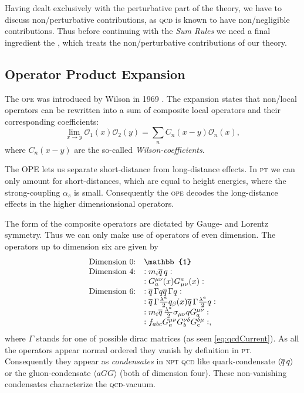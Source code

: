 \documentclass[../../index.tex]{subfiles}
\begin{document}
Having dealt exclusively with the perturbative part of the theory, we have to
discuss non\-/perturbative contributions, as \textsc{qcd} is known to have
non\-/negligible contributions. Thus before continuing with the \textit{Sum
  Rules} we need a final ingredient the , which treats the non\-/perturbative contributions of our theory.


\subsection{Operator Product Expansion}
The \textsc{ope} was introduced by Wilson in 1969 \cite{Wilson1969}. The
expansion states that non\-/local operators can be rewritten into a sum of
composite local operators and their corresponding coefficients:
\begin{equation}
  \label{eq:ope}
  \lim_{x\to y} \mathcal{O}_1(x) \mathcal{O}_2(y) = \sum_n C_n(x-y)\mathcal{O}_n(x),
\end{equation}
where $C_n(x-y)$ are the so-called \textit{Wilson-coefficients}.

The OPE lets us separate short-distance from long-distance effects. In
\textsc{pt} we can only amount for short-distances, which are equal to height
energies, where the strong-coupling $\alpha_s$ is small. Consequently the \textsc{ope}
decodes the long-distance effects in the higher dimensionsional operators.

The form of the composite operators are dictated by Gauge- and Lorentz symmetry.
Thus we can only make use of operators of even dimension. The operators up to
dimension six are given by \cite{Pascual1984}
\begin{equation}
  \begin{array}{ll}
    \text{Dimension 0:} & \mathbb{1} \\
    \text{Dimension 4:} & :m_i \anti{q} q: \\
                        & :G_a^{\mu\nu}(x) G_{\mu\nu}^a(x): \\
    \text{Dimension 6:} & :\anti{q} \Gamma q \anti{q} \Gamma q: \\
                        & :\anti{q} \Gamma \frac{\lambda^a}{2} q_\beta(x) \anti{q} \Gamma \frac{\lambda^a}{2} q: \\
                        & :m_i \anti{q} \frac{\lambda^a}{2} \sigma_{\mu\nu} q G^{\mu\nu}_a: \\
                        & :f_{abc} G_a^{\mu\nu} G_b^{\nu\delta} G_c^{\delta\mu}:,
  \end{array}
\end{equation}
where $\Gamma$ stands for one of possible dirac matrices (as seen
\cref{eq:qcdCurrent}). As all the operators appear normal ordered they vanish by
definition in \textsc{pt}. Consequently they appear as \textit{condensates} in
\textsc{npt qcd} like quark-condensate $\langle \overline{q}\, q \rangle$ or
the gluon-condensate $\langle a GG \rangle$ (both of dimension four). These
non-vanishing condensates characterize the \textsc{qcd}-vacuum.
\end{document}
